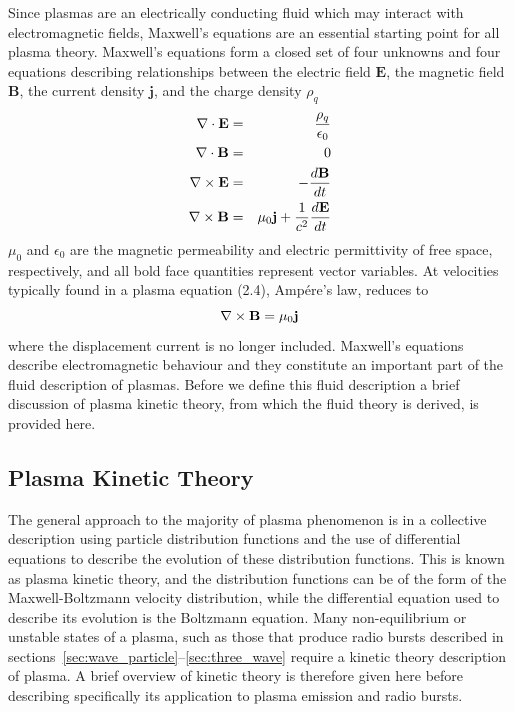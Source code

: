 Since plasmas are an electrically conducting fluid which may interact with electromagnetic fields, Maxwell's equations are an essential starting point for all plasma theory. Maxwell's equations form a closed set of four unknowns and four equations describing relationships between the electric field $\mathbf{E}$, the magnetic field $\mathbf{B}$, the current density $\mathbf{j}$, and the charge density $\rho_q$
\begin{eqnarray}
\nabla \cdot \mathbf{E} &=& \frac{\rho_q}{\epsilon_0} \\
\nabla \cdot \mathbf{B} &=& 0 \\
{\bf \nabla} \times{\mathbf{E}} &=& - \frac{d\mathbf{B}}{dt} \\
{\bf \nabla} \times{\mathbf{B}} &=& \mu_0 \mathbf{j} + \frac{1}{c^2}\frac{d\mathbf{E}}{dt} 
\end{eqnarray}
$\mu_0$ and $\epsilon_0$ are the magnetic permeability and electric permittivity of free space, respectively, and all bold face quantities represent vector variables. At velocities typically found in a plasma equation (2.4), Amp\'{e}re's law, reduces to
\begin{equation}
{\bf \nabla} \times{\mathbf{B}} = \mu_0 \mathbf{j}
\end{equation}
where the displacement current is no longer included. Maxwell's equations describe electromagnetic behaviour and they constitute an important part of the fluid description of plasmas. Before we define this fluid description a brief discussion of plasma kinetic theory, from which the fluid theory is derived, is provided here.

\subsection{Plasma Kinetic Theory}\label{sec:11}

The general approach to the majority of plasma phenomenon is in a collective description using particle distribution functions and the use of differential equations to describe the evolution of these distribution functions. This is known as plasma kinetic theory, and the distribution functions can be of the form of the Maxwell-Boltzmann velocity distribution, while the differential equation used to describe its evolution is the Boltzmann equation. Many non-equilibrium or unstable states of a plasma, such as those that produce radio bursts described in sections~\ref{sec:wave_particle}--\ref{sec:three_wave} require a kinetic theory description of plasma. A brief overview of kinetic theory is therefore given here before describing specifically its application to plasma emission and radio bursts.

